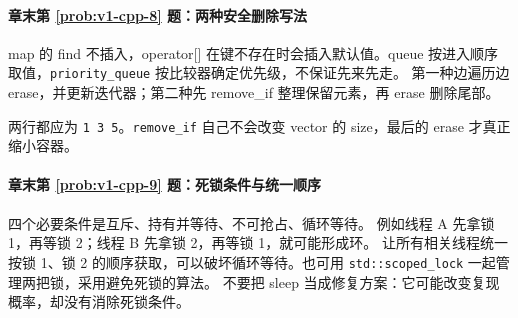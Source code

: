 \paragraph*{章末第 \ref{prob:v1-cpp-8} 题：两种安全删除写法}
\begin{solution}
map 的 find 不插入，operator[] 在键不存在时会插入默认值。queue 按进入顺序取值，\texttt{priority\_queue} 按比较器确定优先级，不保证先来先走。
第一种边遍历边 erase，并更新迭代器；第二种先 remove\_if 整理保留元素，再 erase 删除尾部。
两行都应为 \texttt{1 3 5}。\texttt{remove\_if} 自己不会改变 vector 的 size，最后的 erase 才真正缩小容器。
\end{solution}

\paragraph*{章末第 \ref{prob:v1-cpp-9} 题：死锁条件与统一顺序}
\begin{solution}
四个必要条件是互斥、持有并等待、不可抢占、循环等待。
例如线程 A 先拿锁 1，再等锁 2；线程 B 先拿锁 2，再等锁 1，就可能形成环。
让所有相关线程统一按锁 1、锁 2 的顺序获取，可以破坏循环等待。也可用 \texttt{std::scoped\_lock} 一起管理两把锁，采用避免死锁的算法。
不要把 sleep 当成修复方案：它可能改变复现概率，却没有消除死锁条件。
\end{solution}

